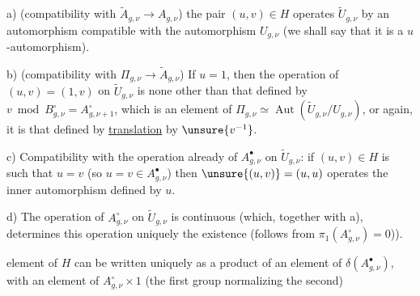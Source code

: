 
a)  (compatibility with \(\widetilde A_{g,\nu}\to A_{g,\nu}\)) the pair \((u,v)\in H\) operates  \(\widetilde U_{g,\nu}\) by an automorphism compatible with the automorphism  \(U_{g,\nu}\) (we shall say that it is a \(u\)-automorphism).

b) (compatibility with \(\Pi_{g,\nu}\to\widetilde A_{g,\nu}\)) If \(u=1\),  then the operation of \((u,v)=(1,v)\) on \(\widetilde U_{g,\nu}\) is none other than that defined by \(v\bmod B_{g,\nu}^{\circ}=A_{g,\nu+1}^{\circ}\), which is an element of \(\Pi_{g,\nu}\simeq\operatorname{Aut}(\widetilde U_{g,\nu}/U_{g,\nu})\), or again, it is that defined by \uline{translation}  by \(\unsure{v^{-1}}\).


c) Compatibility with  the operation already   of \(A_{g,\nu}^{\bullet}\) on \(\widetilde U_{g,\nu}\): if \((u,v)\in H\) is such that \(u=v\) (so \(u=v\in A_{g,\nu}^{\bullet}\)) then \(\unsure{(u,v)}=(u,u)\) operates  the inner automorphism defined by \(u\).


d)  The operation of \(A_{g,\nu}^{\circ}\) on \(\widetilde U_{g,\nu}\) is continuous (which, together with a), determines this operation uniquely   the existence  (follows from \(\pi_1(A_{g,\nu}^{\circ})=0\))).


 element  of \(H\) can be written uniquely as a product of an element  of \(\delta(A_{g,\nu}^{\bullet})\), with an element  of \(A_{g,\nu}^{\circ}\times 1\) (the first group normalizing the second)


